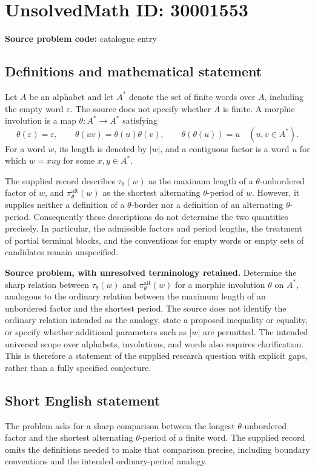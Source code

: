 \documentclass[11pt]{article}
\begin{document}
\section*{UnsolvedMath ID: 30001553}
\textbf{Source problem code:} catalogue entry
\subsection{Definitions and mathematical statement}
Let \(A\) be an alphabet and let \(A^*\) denote the set of finite words over \(A\), including the empty word \(\varepsilon\). The source does not specify whether \(A\) is finite. A morphic involution is a map \(\theta:A^*\to A^*\) satisfying
\[
\theta(\varepsilon)=\varepsilon,\qquad
\theta(uv)=\theta(u)\theta(v),\qquad
\theta(\theta(u))=u
\quad (u,v\in A^*).
\]
For a word \(w\), its length is denoted by \(|w|\), and a contiguous factor is a word \(u\) for which \(w=xuy\) for some \(x,y\in A^*\).

The supplied record describes \(\tau_\theta(w)\) as the maximum length of a \(\theta\)-unbordered factor of \(w\), and \(\pi_\theta^{\mathrm{alt}}(w)\) as the shortest alternating \(\theta\)-period of \(w\). However, it supplies neither a definition of a \(\theta\)-border nor a definition of an alternating \(\theta\)-period. Consequently these descriptions do not determine the two quantities precisely. In particular, the admissible factors and period lengths, the treatment of partial terminal blocks, and the conventions for empty words or empty sets of candidates remain unspecified.

\textbf{Source problem, with unresolved terminology retained.} Determine the sharp relation between \(\tau_\theta(w)\) and \(\pi_\theta^{\mathrm{alt}}(w)\) for a morphic involution \(\theta\) on \(A^*\), analogous to the ordinary relation between the maximum length of an unbordered factor and the shortest period. The source does not identify the ordinary relation intended as the analogy, state a proposed inequality or equality, or specify whether additional parameters such as \(|w|\) are permitted. The intended universal scope over alphabets, involutions, and words also requires clarification. This is therefore a statement of the supplied research question with explicit gaps, rather than a fully specified conjecture.
\subsection{Short English statement}
The problem asks for a sharp comparison between the longest \(\theta\)-unbordered factor and the shortest alternating \(\theta\)-period of a finite word. The supplied record omits the definitions needed to make that comparison precise, including boundary conventions and the intended ordinary-period analogy.
\end{document}
